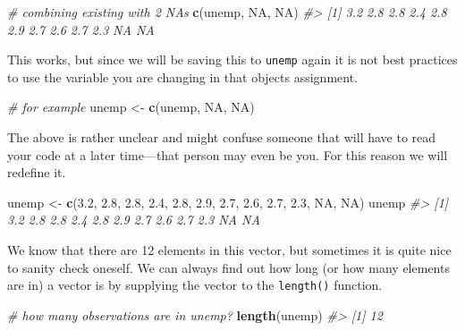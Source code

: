 \documentclass[
]{book}
\newenvironment{Shaded}{\begin{snugshade}}{\end{snugshade}}
\newcommand{\CommentTok}[1]{\textcolor[rgb]{0.56,0.35,0.01}{\textit{#1}}}
\newcommand{\FloatTok}[1]{\textcolor[rgb]{0.00,0.00,0.81}{#1}}
\newcommand{\KeywordTok}[1]{\textcolor[rgb]{0.13,0.29,0.53}{\textbf{#1}}}
\newcommand{\NormalTok}[1]{#1}
\newcommand{\OtherTok}[1]{\textcolor[rgb]{0.56,0.35,0.01}{#1}}
\newcommand{\StringTok}[1]{\textcolor[rgb]{0.31,0.60,0.02}{#1}}
\begin{document}
\begin{Shaded}
\begin{Highlighting}[]
\CommentTok{\# combining existing with 2 NAs}
\KeywordTok{c}\NormalTok{(unemp, }\OtherTok{NA}\NormalTok{, }\OtherTok{NA}\NormalTok{)}
\CommentTok{\#\textgreater{}  [1] 3.2 2.8 2.8 2.4 2.8 2.9 2.7 2.6 2.7 2.3  NA  NA}
\end{Highlighting}
\end{Shaded}

This works, but since we will be saving this to \texttt{unemp} again it is not best practices to use the variable you are changing in that objects assignment.

\begin{Shaded}
\begin{Highlighting}[]
\CommentTok{\# for example}
\NormalTok{unemp \textless{}{-}}\StringTok{ }\KeywordTok{c}\NormalTok{(unemp, }\OtherTok{NA}\NormalTok{, }\OtherTok{NA}\NormalTok{)}
\end{Highlighting}
\end{Shaded}

The above is rather unclear and might confuse someone that will have to read your code at a later time---that person may even be you. For this reason we will redefine it.

\begin{Shaded}
\begin{Highlighting}[]
\NormalTok{unemp \textless{}{-}}\StringTok{ }\KeywordTok{c}\NormalTok{(}\FloatTok{3.2}\NormalTok{, }\FloatTok{2.8}\NormalTok{, }\FloatTok{2.8}\NormalTok{, }\FloatTok{2.4}\NormalTok{, }\FloatTok{2.8}\NormalTok{, }\FloatTok{2.9}\NormalTok{, }\FloatTok{2.7}\NormalTok{, }\FloatTok{2.6}\NormalTok{, }\FloatTok{2.7}\NormalTok{, }\FloatTok{2.3}\NormalTok{, }\OtherTok{NA}\NormalTok{, }\OtherTok{NA}\NormalTok{)}
\NormalTok{unemp}
\CommentTok{\#\textgreater{}  [1] 3.2 2.8 2.8 2.4 2.8 2.9 2.7 2.6 2.7 2.3  NA  NA}
\end{Highlighting}
\end{Shaded}

We know that there are 12 elements in this vector, but sometimes it is quite nice to sanity check oneself. We can always find out how long (or how many elements are in) a vector is by supplying the vector to the \texttt{length()} function.

\begin{Shaded}
\begin{Highlighting}[]
\CommentTok{\# how many observations are in \textasciigrave{}unemp\textasciigrave{}?}
\KeywordTok{length}\NormalTok{(unemp)}
\CommentTok{\#\textgreater{} [1] 12}
\end{Highlighting}
\end{Shaded}
\end{document}
